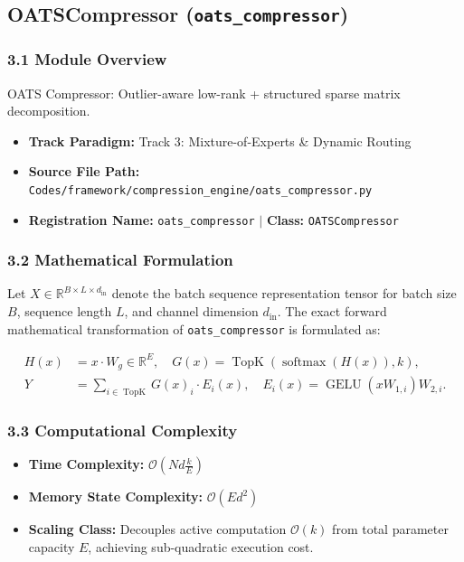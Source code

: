 \subsection{OATSCompressor (\texttt{oats\_compressor})}
\label{sec:app_module_oats_compressor}

\subsubsection*{3.1 Module Overview}
OATS Compressor: Outlier-aware low-rank + structured sparse matrix decomposition.
\begin{itemize}
    \item \textbf{Track Paradigm:} Track 3: Mixture-of-Experts & Dynamic Routing
    \item \textbf{Source File Path:} \texttt{Codes/framework/compression\_engine/oats\_compressor.py}
    \item \textbf{Registration Name:} \texttt{oats\_compressor} $\mid$ \textbf{Class:} \texttt{OATSCompressor}
\end{itemize}

\subsubsection*{3.2 Mathematical Formulation}
Let $X \in \mathbb{R}^{B \times L \times d_{\text{in}}}$ denote the batch sequence representation tensor for batch size $B$, sequence length $L$, and channel dimension $d_{\text{in}}$. The exact forward mathematical transformation of \texttt{oats\_compressor} is formulated as:

\begin{align}
H(x) &= x \cdot W_g \in \mathbb{R}^{E}, \quad G(x) = \operatorname{TopK}\left(\operatorname{softmax}(H(x)), k\right), \\
Y &= \sum_{i \in \operatorname{TopK}} G(x)_i \cdot E_i(x), \quad E_i(x) = \operatorname{GELU}(x W_{1, i}) W_{2, i}.
\end{align}


\subsubsection*{3.3 Computational Complexity}
\begin{itemize}
    \item \textbf{Time Complexity:} $\mathcal{O}(N d \frac{k}{E})$
    \item \textbf{Memory State Complexity:} $\mathcal{O}(E d^2)$
    \item \textbf{Scaling Class:} Decouples active computation $\mathcal{O}(k)$ from total parameter capacity $E$, achieving sub-quadratic execution cost.
\end{itemize}

